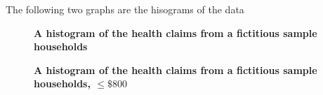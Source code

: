 \documentclass[letterpaper,12pt]{article}
\theoremstyle{definition}
\begin{document}
The following two graphs are the hisograms of the data 
\begin{figure}[H]\centering\captionsetup{width=4.0in}
   \caption{\textbf{A histogram of the health claims from a fictitious sample households}}
\end{figure}
\par
\begin{figure}[H]\centering\captionsetup{width=4.0in}
   \caption{\textbf{A histogram of the health claims from a fictitious sample households, $\leq \$800$}}
\end{figure}
\par\bigskip
\end{document}

